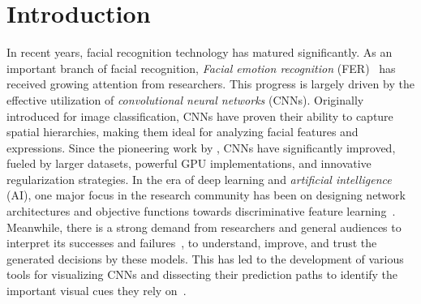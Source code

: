 \section{Introduction}
\label{sec:intro}


In recent years, facial recognition technology has matured significantly. 
As an important branch of facial recognition, 
\textit{Facial emotion recognition} (FER)~\cite{Ko18,JainSS19,YinTLS019,Malik0R21} has received growing attention from researchers. 
This progress is largely driven by the effective utilization of \textit{convolutional neural networks} (CNNs). 
Originally introduced for image classification, 
CNNs have proven their ability to capture spatial hierarchies, 
making them ideal for analyzing facial features and expressions. 
Since the pioneering work by \citet{Lecun89Backpropagation}, 
CNNs have significantly improved, fueled by larger datasets, 
powerful GPU implementations, 
and innovative regularization strategies.
In the era of deep learning and \textit{artificial intelligence} (AI), 
one major focus in the research community has been on designing network architectures 
and objective functions towards discriminative feature learning~\cite{HeZRS16, liu2017learning, wen2016discriminative}. 
Meanwhile, 
there is a strong demand from researchers and general audiences to interpret its successes and failures~\cite{GoodfellowSS14}, 
to understand, improve, and trust the generated decisions by these models. 
This has led to the development of various tools for visualizing CNNs and dissecting their prediction paths to identify the important visual cues they rely on~\cite{olah2018building}. 

